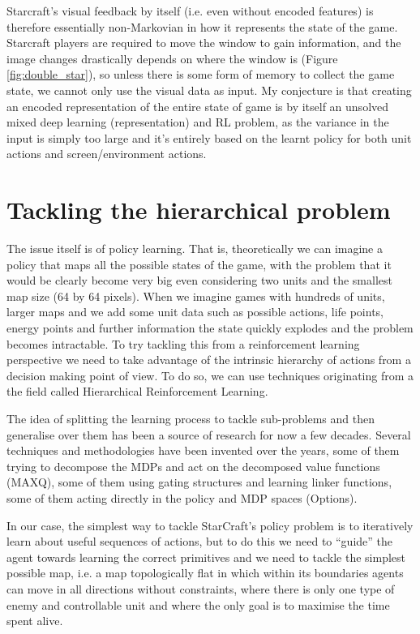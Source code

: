 \documentclass[bsc,frontabs,twoside,singlespacing,parskip,deptreport]{infthesis}     %
\begin{document}
Starcraft’s visual feedback by itself (i.e. even without encoded features) is
therefore essentially non-Markovian in how it represents the state of the game.
Starcraft players are required to move the window to gain information, and the
image changes drastically depends on where the window is (Figure
\ref{fig:double_star}), so unless there is some form of memory to collect the game
state, we cannot only use the visual data as input. My conjecture is that
creating an encoded representation of the entire state of game is by itself an
unsolved mixed deep learning (representation) and RL problem, as the variance in
the input is simply too large and it's entirely based on the learnt policy for
both unit actions and screen/environment actions.

\section{Tackling the hierarchical problem}

The issue itself is of policy learning. That is, theoretically we can imagine a
policy that maps all the possible states of the game, with the problem that it
would be clearly become very big even considering two units and the smallest map
size (64 by 64 pixels). When we imagine games with hundreds of units, larger
maps and we add some unit data such as possible actions, life points, energy
points and further information the state quickly explodes and the problem
becomes intractable. To try tackling this from a reinforcement learning
perspective we need to take advantage of the intrinsic hierarchy of actions from
a decision making point of view. To do so, we can use techniques originating
from a the field called Hierarchical Reinforcement Learning.

The idea of splitting the learning process to tackle sub-problems and then
generalise over them has been a source of research for now a few decades.
Several techniques and methodologies have been invented over the years, some of
them trying to decompose the MDPs and act on the decomposed value functions
(MAXQ), some of them using gating structures and learning linker functions, some
of them acting directly in the policy and MDP spaces (Options).

In our case, the simplest way to tackle StarCraft's policy problem is to
iteratively learn about useful sequences of actions, but to do this we need to
``guide'' the agent towards learning the correct primitives and we need to
tackle the simplest possible map, i.e. a map topologically flat in which within
its boundaries agents can move in all directions without constraints, where
there is only one type of enemy and controllable unit and where the only goal is
to maximise the time spent alive.
\end{document}
